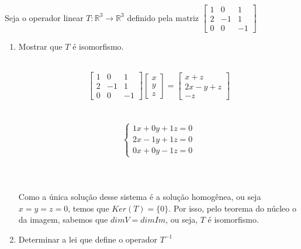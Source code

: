 	\item Seja o operador linear $T:\mathbb{R}^3 \rightarrow \mathbb{R}^3$
	definido pela matriz
	$\left[
	\begin{array}{ccc}
		1 & 0 & 1 \\
		2 & -1 & 1 \\
		0 & 0 & -1
	\end{array}
	\right]$
	
	\begin{enumerate}
		\item Mostrar que $T$ é isomorfismo.
		\\ \\
		\solucao
		
		$$
		\left[
		\begin{array}{ccc}
			1 & 0 & 1 \\
			2 & -1 & 1 \\
			0 & 0 & -1
		\end{array}
		\right]
		\left[
		\begin{array}{c}
			x \\
			y \\
			z 
		\end{array}
		\right]
		=
		\left[
		\begin{array}{c}
			x + z\\
			2x - y +z \\
			-z 
		\end{array}
		\right]
		$$
	\\ \\
	 $$\left\{
	 \begin{array}{lll}
	 	1x + 0y + 1z = 0 \\
	 	2x - 1y + 1z = 0  \\
	 	0x + 0y - 1z = 0
	 \end{array}
	 \right.$$
	\\ \\
	\paragraph{} Como a única solução desse sistema é a solução homogênea, ou seja
	$x = y = z = 0$, temos que $Ker(T) = \{0\}$. Por isso, pelo
	teorema do núcleo o da imagem, sabemos que $dim V = dim Im$, ou
	seja, $T$ é isomorfismo.
	
	\item Determinar a lei que define o operador $T^{-1}$
	\\ \\
	\solucao
	

\end{enumerate}
